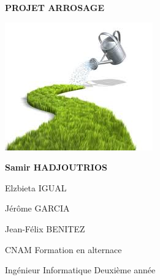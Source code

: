 \begin{titlepage}
\color[RGB]{91, 155, 213}
\parindent=0pt

\hrulefill
\begin{center}\bfseries\Huge
PROJET ARROSAGE
\end{center}
\hrulefill


\begin{center}
\includegraphics[scale=1.0]{images/arrosage.jpg}%
\end{center}

\vspace*{1cm}
\begin{center}\bfseries\Large
Samir HADJOUTRIOS

Elzbieta IGUAL

Jérôme GARCIA

Jean-Félix BENITEZ
\end{center}


CNAM  Formation en alternace

Ingénieur Informatique  Deuxième année

\end{titlepage}
